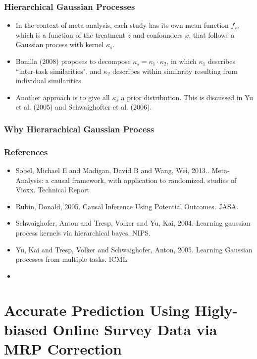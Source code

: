 \documentclass[xetex,mathserif,serif]{beamer}
\begin{document}
\begin{frame}
  \frametitle{Hierarchical Gaussian Processes}
  \begin{itemize}
  \item In the context of meta-analysis, each study has its own mean function
    $f_s$, which is a function of the treatment $z$ and confounders $x$, that
    follows a Gaussian process with kernel $\kappa_s$.
  \item Bonilla (2008) proposes to decompose $\kappa_s=\kappa_1\cdot\kappa_2$, in
    which $\kappa_1$ describes ``inter-task similarities", and $\kappa_2$ describes
    within similarity resulting from individual similarities.
  \item Another approach is to give all $\kappa_s$ a prior distribution. This is
    discussed in Yu et al. (2005) and Schwaighofter et al. (2006).
  \end{itemize}
\end{frame}

\begin{frame}
  \frametitle{Why Hierarachical Gaussian Process}
\end{frame}

\begin{frame}
  \frametitle{References}
  \begin{itemize}
  \item Sobel, Michael E and Madigan, David B and Wang, Wei, 2013.. Meta-Analysis: a
    causal framework, with application to randomized.  studies of
    Vioxx. Technical Report
  \item Rubin, Donald, 2005. Causal Inference Using Potential Outcomes. JASA.
  \item Schwaighofer, Anton and Tresp, Volker and Yu, Kai, 2004. Learning
    gaussian process kernels via hierarchical bayes. NIPS.
  \item Yu, Kai and Tresp, Volker and Schwaighofer, Anton, 2005. Learning Gaussian
    processes from multiple tasks. ICML.
  \item 
  \end{itemize}
  
\end{frame}
\section[Highly-biased Polls]{Accurate Prediction Using Higly-biased Online Survey Data via MRP
  Correction}
\end{document}
